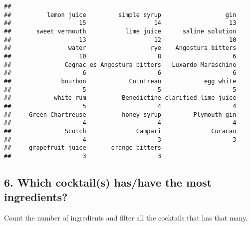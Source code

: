 \documentclass[
]{article}
\newenvironment{Shaded}{\begin{snugshade}}{\end{snugshade}}
\newcommand{\DataTypeTok}[1]{\textcolor[rgb]{0.13,0.29,0.53}{#1}}
\newcommand{\DecValTok}[1]{\textcolor[rgb]{0.00,0.00,0.81}{#1}}
\newcommand{\KeywordTok}[1]{\textcolor[rgb]{0.13,0.29,0.53}{\textbf{#1}}}
\newcommand{\NormalTok}[1]{#1}
\newcommand{\OperatorTok}[1]{\textcolor[rgb]{0.81,0.36,0.00}{\textbf{#1}}}
\newcommand{\OtherTok}[1]{\textcolor[rgb]{0.56,0.35,0.01}{#1}}
\begin{document}
\begin{Shaded}
\end{Shaded}

\begin{verbatim}
## 
##          lemon juice         simple syrup                  gin 
##                   15                   14                   13 
##       sweet vermouth           lime juice      saline solution 
##                   13                   12                   10 
##                water                  rye    Angostura bitters 
##                   10                    8                    6 
##               Cognac es Angostura bitters   Luxardo Maraschino 
##                    6                    6                    6 
##              bourbon            Cointreau            egg white 
##                    5                    5                    5 
##            white rum          Benedictine clarified lime juice 
##                    5                    4                    4 
##     Green Chartreuse          honey syrup         Plymouth gin 
##                    4                    4                    4 
##               Scotch              Campari              Curacao 
##                    4                    3                    3 
##     grapefruit juice       orange bitters 
##                    3                    3
\end{verbatim}

\hypertarget{which-cocktails-hashave-the-most-ingredients}{%
\subsection{6. Which cocktail(s) has/have the most
ingredients?}\label{which-cocktails-hashave-the-most-ingredients}}

Count the number of ingredients and filter all the cocktails that has
that many.

\begin{Shaded}
\end{Shaded}
\end{document}
